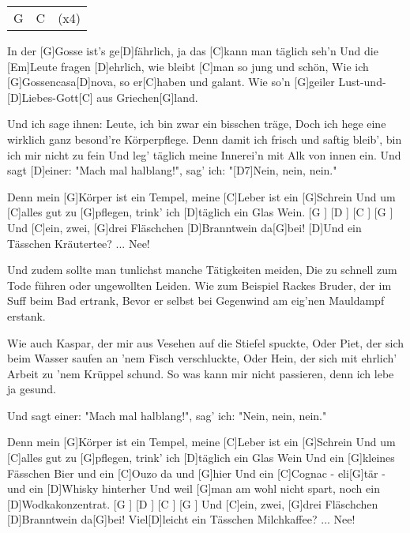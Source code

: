 

\begin{guitar}
	 {\footnotesize\begin{tabular}{l|l|l}
			G & C & (x4)
	\end{tabular}}
	\vspace{-0.2em}
	In der [G]Gosse ist's ge[D]fährlich, ja das [C]kann man täglich seh'n
	Und die [Em]Leute fragen [D]ehrlich, wie bleibt [C]man so jung und schön,
	Wie ich [G]Gossencasa[D]nova, so er[C]haben und galant.
	Wie so'n [G]geiler Lust-und-[D]Liebes-Gott[C] aus Griechen[G]land.
	
	Und ich sage ihnen: Leute, ich bin zwar ein bisschen träge,
	Doch ich hege eine wirklich ganz besond're Körperpflege.
	Denn damit ich frisch und saftig bleib', bin ich mir nicht zu fein
	Und leg' täglich meine Innerei'n mit Alk von innen ein.
	Und sagt [D]einer: "Mach mal halblang!", sag' ich: "[D7]Nein, nein, nein."
	
	Denn mein [G]Körper ist ein Tempel, meine [C]Leber ist ein [G]Schrein
	Und um [C]alles gut zu [G]pflegen, trink' ich [D]täglich ein Glas Wein.
	[G ] [D ] [C ] [G ] Und [C]ein, zwei, [G]drei Fläschchen [D]Branntwein da[G]bei!
	[D]Und ein Tässchen Kräutertee? ... Nee!
	
	Und zudem sollte man tunlichst manche Tätigkeiten meiden,
	Die zu schnell zum Tode führen oder ungewollten Leiden.
	Wie zum Beispiel Rackes Bruder, der im Suff beim Bad ertrank,
	Bevor er selbst bei Gegenwind am eig'nen Mauldampf erstank.
	
	Wie auch Kaspar, der mir aus Vesehen auf die Stiefel spuckte,
	Oder Piet, der sich beim Wasser saufen an 'nem Fisch verschluckte,
	Oder Hein, der sich mit ehrlich' Arbeit zu 'nem Krüppel schund.
	So was kann mir nicht passieren, denn ich lebe ja gesund.
	
	Und sagt einer: "Mach mal halblang!", sag' ich: "Nein, nein, nein."
	
	\vspace{-0.2em}
	Denn mein [G]Körper ist ein Tempel, meine [C]Leber ist ein [G]Schrein
	Und um [C]alles gut zu [G]pflegen, trink' ich [D]täglich ein Glas Wein
	Und ein [G]kleines Fässchen Bier und ein [C]Ouzo da und [G]hier
	Und ein [C]Cognac - eli[G]tär - und ein [D]Whisky hinterher
	Und weil [G]man am wohl nicht spart, noch ein [D]Wodkakonzentrat.
	[G ] [D ] [C ] [G ] Und [C]ein, zwei, [G]drei Fläschchen [D]Branntwein da[G]bei!
	Viel[D]leicht ein Tässchen Milchkaffee? ... Nee!
	

\end{guitar}
